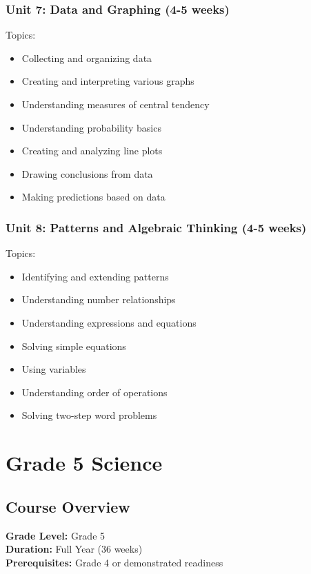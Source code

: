 \documentclass[11pt,letterpaper]{report}
\begin{document}
\subsection{Unit 7: Data and Graphing (4-5 weeks)}

Topics:
\begin{itemize}
\item Collecting and organizing data
\item Creating and interpreting various graphs
\item Understanding measures of central tendency
\item Understanding probability basics
\item Creating and analyzing line plots
\item Drawing conclusions from data
\item Making predictions based on data
\end{itemize}

\subsection{Unit 8: Patterns and Algebraic Thinking (4-5 weeks)}

Topics:
\begin{itemize}
\item Identifying and extending patterns
\item Understanding number relationships
\item Understanding expressions and equations
\item Solving simple equations
\item Using variables
\item Understanding order of operations
\item Solving two-step word problems
\end{itemize}

\chapter{Grade 5 Science}

\section{Course Overview}

\textbf{Grade Level:} Grade 5\\
\textbf{Duration:} Full Year (36 weeks)\\
\textbf{Prerequisites:} Grade 4 or demonstrated readiness
\end{document}
